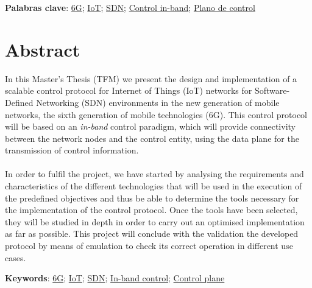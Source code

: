 \vspace{1cm}

\textbf{Palabras clave}: \href{https://scholar.google.com/scholar?q=6g}{6G}; \href{https://scholar.google.es/scholar?q=Internet+of+Things}{IoT};
\href{https://www.opennetworking.org/sdn-definition}{SDN}; \href{https://scholar.google.com/scholar?q=sdn+in-band+control}{Control in-band};
\href{https://scholar.google.es/scholar?q=control+plane+sdn}{Plano de control}


\cleardoublepage %



\chapter{Abstract}
\thispagestyle{empty}

In this Master's Thesis (TFM) we present the design and implementation of a scalable control protocol for Internet of Things (IoT) networks for Software-Defined Networking (SDN) environments in the new generation of mobile networks, the sixth generation of mobile technologies (6G). This control protocol will be based on an \textit{in-band} control paradigm, which will provide connectivity between the network nodes and the control entity, using the data plane for the transmission of control information.\\
\\
In order to fulfil the project, we have started by analysing the requirements and characteristics of the different technologies that will be used in the execution of the predefined objectives and thus be able to determine the tools necessary for the implementation of the control protocol. Once the tools have been selected, they will be studied in depth in order to carry out an optimised implementation as far as possible. This project will conclude with the validation the developed protocol by means of emulation to check its correct operation in different use cases.


\vspace{1cm}

\textbf{Keywords}: \href{https://scholar.google.com/scholar?q=6g}{6G}; \href{https://scholar.google.es/scholar?q=Internet+of+Things}{IoT};
\href{https://www.opennetworking.org/sdn-definition}{SDN}; \href{https://scholar.google.com/scholar?q=sdn+in-band+control}{In-band control};
\href{https://scholar.google.es/scholar?q=control+plane+sdn}{Control plane}



